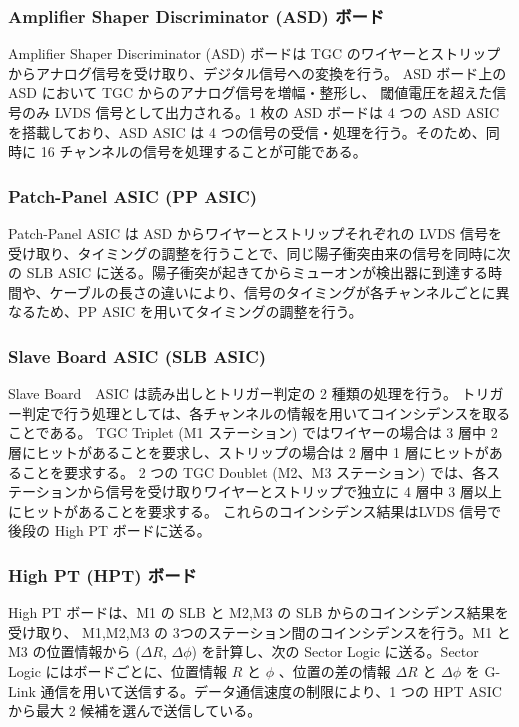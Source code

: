 \subsubsection{Amplifier Shaper Discriminator (ASD) ボード}
Amplifier Shaper Discriminator (ASD) ボードは TGC のワイヤーとストリップからアナログ信号を受け取り、デジタル信号への変換を行う。
ASD ボード上の ASD において TGC からのアナログ信号を増幅・整形し、 閾値電圧を超えた信号のみ LVDS 信号として出力される。1 枚の ASD ボードは 4 つの ASD ASIC を搭載しており、ASD ASIC は 4 つの信号の受信・処理を行う。そのため、同時に 16 チャンネルの信号を処理することが可能である。

\subsubsection{Patch-Panel ASIC (PP ASIC)}
Patch-Panel ASIC は ASD からワイヤーとストリップそれぞれの LVDS 信号を受け取り、タイミングの調整を行うことで、同じ陽子衝突由来の信号を同時に次の SLB ASIC に送る。陽子衝突が起きてからミューオンが検出器に到達する時間や、ケーブルの長さの違いにより、信号のタイミングが各チャンネルごとに異なるため、PP ASIC を用いてタイミングの調整を行う。

\subsubsection{Slave Board ASIC (SLB ASIC)}
Slave Board　ASIC は読み出しとトリガー判定の 2 種類の処理を行う。
トリガー判定で行う処理としては、各チャンネルの情報を用いてコインシデンスを取ることである。
TGC Triplet (M1 ステーション) ではワイヤーの場合は 3 層中 2 層にヒットがあることを要求し、ストリップの場合は 2 層中 1 層にヒットがあることを要求する。
2 つの TGC Doublet (M2、M3 ステーション) では、各ステーションから信号を受け取りワイヤーとストリップで独立に 4 層中 3 層以上にヒットがあることを要求する。 これらのコインシデンス結果はLVDS 信号で後段の High PT ボードに送る。

\subsubsection{High PT (HPT) ボード}
High PT ボードは、M1 の SLB と M2,M3 の SLB からのコインシデンス結果を受け取り、 M1,M2,M3 の 3つのステーション間のコインシデンスを行う。M1 と M3 の位置情報から ($\Delta R$, $\Delta \phi$) を計算し、次の Sector Logic に送る。Sector Logic にはボードごとに、位置情報 $R$ と $\phi$ 、位置の差の情報 $\Delta R$ と $\Delta \phi$ を G-Link 通信を用いて送信する。データ通信速度の制限により、1 つの HPT ASIC から最大 2 候補を選んで送信している。

